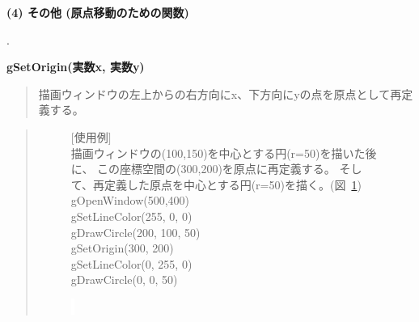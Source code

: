 \documentclass[11pt,a4j]{jarticle}
\newcounter{enum2}
\newenvironment{enumerate2}{%
   \begin{list}%
   {%
      \arabic{enum2}.\ \,%
   }%
   {%
      \usecounter{enum2}
      \setlength{\itemindent}{0zw}%
      \setlength{\leftmargin}{3zw}%
      \setlength{\rightmargin}{0zw}%
      \setlength{\labelsep}{0zw}%
      \setlength{\labelwidth}{3zw}%
      \setlength{\itemsep}{0em}%
      \setlength{\parsep}{0em}%
      \setlength{\listparindent}{0zw}%
   }
}{%
   \end{list}%
}
\begin{document}
{\large{
{\bf{
(4) その他 (原点移動のための関数)
}}
}}
\begin{enumerate2}
\item {\bf{gSetOrigin(実数x, 実数y)}} \\
\vspace{-5mm}
   \begin{quotation}
     描画ウィンドウの左上からの右方向にx、下方向にyの点を原点として再定義する。
   \end{quotation}
   \begin{quotation}
\begin{figure}[!h]
\begin{center}
\begin{minipage}{25zw}
	   \noindent $[$使用例$]$\\

描画ウィンドウの(100,150)を中心とする円(r=50)を描いた後に、
この座標空間の(300,200)を原点に再定義する。
そして、再定義した原点を中心とする円(r=50)を描く。(図~\ref{fig:gsetmaps01})
\ \\

{\small{
          gOpenWindow(500,400) \\
          gSetLineColor(255, 0, 0)  \\
          gDrawCircle(200, 100, 50)  \\
          gSetOrigin(300, 200) \\
          gSetLineColor(0, 255, 0)  \\
          gDrawCircle(0, 0, 50)  \\
}}
\end{minipage}
\begin{minipage}{20zw}
\begin{center}
\caption{$\!\!\!\!$\colorbox{white}{{\textcolor{white}{:}}}}
\label{fig:gsetmaps01}
\end{center}
\end{minipage}
\end{center}
\end{figure}
   \end{quotation}
\end{enumerate2}
\end{document}
